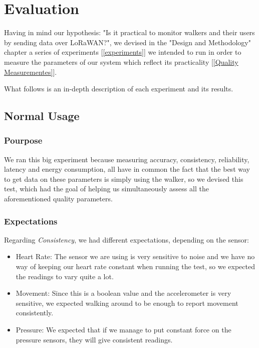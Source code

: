 \chapter{Evaluation}
\label{cha:evaluation}

Having in mind our hypothesis: "Is it practical to monitor walkers and their users by sending data over LoRaWAN?", we devised in the "Design and Methodology" chapter a series of experiments [\ref{experiments}] we intended to run in order to measure the parameters of our system which reflect its practicality [\ref{Quality Measurementes}].

What follows is an in-depth description of each experiment and its results.

\section{Normal Usage}

	\subsection*{Pourpose}
		We ran this big experiment because measuring accuracy, consistency, reliability, latency and energy consumption, all have in common the fact that the best way to get data on these parameters is simply using the walker, so we devised this test, which had the goal of helping us simultaneously assess all the aforementioned quality parameters.

	\subsection*{Expectations}
		Regarding \emph{Consistency}, we had different expectations, depending on the sensor:

		\begin{itemize}
			\item Heart Rate: The sensor we are using is very sensitive to noise and we have no way of keeping our heart rate constant when running the test, so we expected the readings to vary quite a lot.
			\item Movement: Since this is a boolean value and the accelerometer is very sensitive, we expected walking around to be enough to report movement consistently.
			\item Pressure: We expected that if we manage to put constant force on the pressure sensors, they will give consistent readings.
		\end{itemize}

